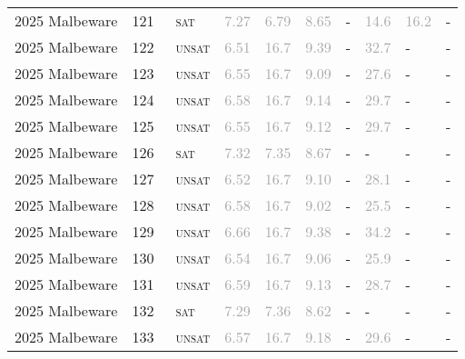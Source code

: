 \begin{center}
{\begin{longtable}{@{}llllllllll@{}}
2025 Malbeware & 121 & ~\textsc{sat} & \textcolor{darkgray}{7.27} & \textcolor{darkgray}{6.79} & \textcolor{darkgray}{8.65} & - & \textcolor{darkgray}{14.6} & \textcolor{darkgray}{16.2} & - \\
2025 Malbeware & 122 & ~\textsc{unsat} & \textcolor{darkgray}{6.51} & \textcolor{darkgray}{16.7} & \textcolor{darkgray}{9.39} & - & \textcolor{darkgray}{32.7} & - & - \\
2025 Malbeware & 123 & ~\textsc{unsat} & \textcolor{darkgray}{6.55} & \textcolor{darkgray}{16.7} & \textcolor{darkgray}{9.09} & - & \textcolor{darkgray}{27.6} & - & - \\
2025 Malbeware & 124 & ~\textsc{unsat} & \textcolor{darkgray}{6.58} & \textcolor{darkgray}{16.7} & \textcolor{darkgray}{9.14} & - & \textcolor{darkgray}{29.7} & - & - \\
2025 Malbeware & 125 & ~\textsc{unsat} & \textcolor{darkgray}{6.55} & \textcolor{darkgray}{16.7} & \textcolor{darkgray}{9.12} & - & \textcolor{darkgray}{29.7} & - & - \\
2025 Malbeware & 126 & ~\textsc{sat} & \textcolor{darkgray}{7.32} & \textcolor{darkgray}{7.35} & \textcolor{darkgray}{8.67} & - & - & - & - \\
2025 Malbeware & 127 & ~\textsc{unsat} & \textcolor{darkgray}{6.52} & \textcolor{darkgray}{16.7} & \textcolor{darkgray}{9.10} & - & \textcolor{darkgray}{28.1} & - & - \\
2025 Malbeware & 128 & ~\textsc{unsat} & \textcolor{darkgray}{6.58} & \textcolor{darkgray}{16.7} & \textcolor{darkgray}{9.02} & - & \textcolor{darkgray}{25.5} & - & - \\
2025 Malbeware & 129 & ~\textsc{unsat} & \textcolor{darkgray}{6.66} & \textcolor{darkgray}{16.7} & \textcolor{darkgray}{9.38} & - & \textcolor{darkgray}{34.2} & - & - \\
2025 Malbeware & 130 & ~\textsc{unsat} & \textcolor{darkgray}{6.54} & \textcolor{darkgray}{16.7} & \textcolor{darkgray}{9.06} & - & \textcolor{darkgray}{25.9} & - & - \\
2025 Malbeware & 131 & ~\textsc{unsat} & \textcolor{darkgray}{6.59} & \textcolor{darkgray}{16.7} & \textcolor{darkgray}{9.13} & - & \textcolor{darkgray}{28.7} & - & - \\
2025 Malbeware & 132 & ~\textsc{sat} & \textcolor{darkgray}{7.29} & \textcolor{darkgray}{7.36} & \textcolor{darkgray}{8.62} & - & - & - & - \\
2025 Malbeware & 133 & ~\textsc{unsat} & \textcolor{darkgray}{6.57} & \textcolor{darkgray}{16.7} & \textcolor{darkgray}{9.18} & - & \textcolor{darkgray}{29.6} & - & - \\

\end{longtable}}
\end{center}
